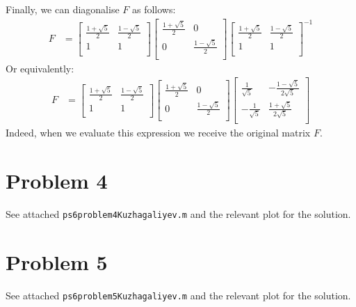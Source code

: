 \documentclass[10pt,letter]{article}
\begin{document}
Finally, we can diagonalise $F$ as follows:
\begin{align*}
F &=
\left[ {\begin{array}{cc}
 \frac{1 + \sqrt{5}}{2} &  \frac{1 - \sqrt{5}}{2} \\
 1 & 1 \\
\end{array} } \right]
\left[ {\begin{array}{cc}
 \frac{1 + \sqrt{5}}{2} &  0 \\
 0 & \frac{1 - \sqrt{5}}{2} \\
\end{array} } \right]
\left[ {\begin{array}{cc}
 \frac{1 + \sqrt{5}}{2} &  \frac{1 - \sqrt{5}}{2} \\
 1 & 1 \\
\end{array} } \right]^{-1}
\end{align*}
Or equivalently:
\begin{align*}
F &=
\left[ {\begin{array}{cc}
 \frac{1 + \sqrt{5}}{2} &  \frac{1 - \sqrt{5}}{2} \\
 1 & 1 \\
\end{array} } \right]
\left[ {\begin{array}{cc}
 \frac{1 + \sqrt{5}}{2} &  0 \\
 0 & \frac{1 - \sqrt{5}}{2} \\
\end{array} } \right]
\left[ {\begin{array}{cc}
 \frac{1}{\sqrt{5}} &  -\frac{1 - \sqrt{5}}{2\sqrt{5}} \\
 -\frac{1}{\sqrt{5}} & \frac{1 + \sqrt{5}}{2\sqrt{5}} \\
\end{array} } \right]
\end{align*}
Indeed, when we evaluate this expression we receive the original matrix $F$.

\section*{Problem 4}
See attached \texttt{ps6problem4Kuzhagaliyev.m} and the relevant plot for the solution.

\section*{Problem 5}
See attached \texttt{ps6problem5Kuzhagaliyev.m} and the relevant plot for the solution.
\end{document}
